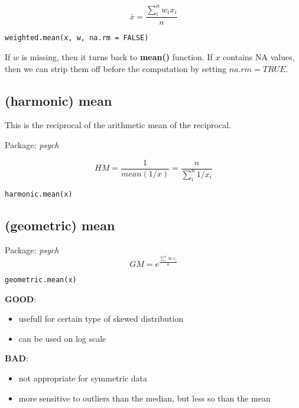 \begin{equation}
  \label{eq:6}
  \bar{x} = \frac{\sum_i^n w_ix_i}{n}
\end{equation}
\begin{verbatim}
weighted.mean(x, w, na.rm = FALSE)
\end{verbatim}
If $w$ is missing, then it turns back to {\bf mean()} function. If $x$
contains NA values, then we can strip them off before the computation
by setting $na.rm=TRUE$.


\subsection{(harmonic) mean}
\label{sec:harmonic-mean}

This is the reciprocal of the arithmetic mean of the reciprocal.

Package: {\it psych}

\begin{equation}
  \label{eq:7}
  HM = \frac{1}{mean(1/x)} = \frac{n}{\sum_i^n 1/x_i}
\end{equation}

\begin{verbatim}
harmonic.mean(x)
\end{verbatim}

\subsection{(geometric) mean}
\label{sec:geometric-mean}

Package: {\it psych}
\begin{equation}
  \label{eq:8}
  GM = e ^{\frac{\sum_i^n \ln x_i}{n}}
\end{equation}
\begin{verbatim}
geometric.mean(x)
\end{verbatim}


{\bf GOOD}:
\begin{itemize}
\item usefull for certain type of skewed distribution
\item can be used on log scale
\end{itemize}

{\bf BAD}:
\begin{itemize}
\item not appropriate for symmetric data
\item more sensitive to outliers than the median, but less so than the
  mean
\end{itemize}


